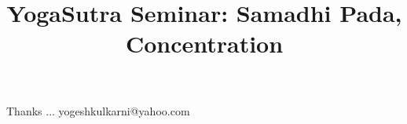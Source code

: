 \documentclass[xcolor=dvipsnames,compress,t,pdf,9pt]{beamer}
\title[\insertframenumber /\inserttotalframenumber]{YogaSutra Seminar: Samadhi Pada, Concentration}
\begin{document}
	\begin{frame}
	\titlepage
	\end{frame}

	

	\begin{frame}[c]{}
	Thanks ...
	\vspace{5mm}
	yogeshkulkarni@yahoo.com
	\end{frame}
\end{document}

